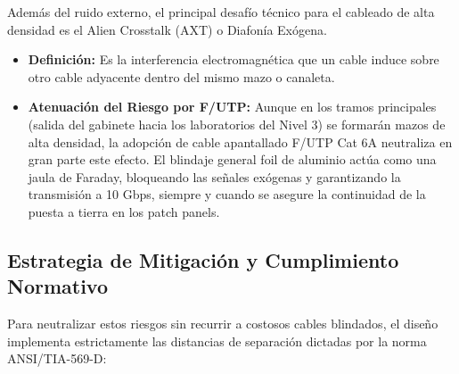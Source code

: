 Además del ruido externo, el principal desafío técnico para el cableado de alta densidad es el Alien Crosstalk (AXT) o Diafonía Exógena.

\begin{itemize}
    \item \textbf{Definición:} Es la interferencia electromagnética que un cable induce sobre otro cable adyacente dentro del mismo mazo o canaleta.
    \item \textbf{Atenuación del Riesgo por F/UTP:} Aunque en los tramos principales (salida del gabinete hacia los laboratorios del Nivel 3) se formarán mazos de alta densidad, la adopción de cable apantallado F/UTP Cat 6A neutraliza en gran parte este efecto. El blindaje general foil de aluminio actúa como una jaula de Faraday, bloqueando las señales exógenas y garantizando la transmisión a 10 Gbps, siempre y cuando se asegure la continuidad de la puesta a tierra en los patch panels.
\end{itemize}

\subsection*{Estrategia de Mitigación y Cumplimiento Normativo}

Para neutralizar estos riesgos sin recurrir a costosos cables blindados, el diseño implementa estrictamente las distancias de separación dictadas por la norma ANSI/TIA-569-D:

